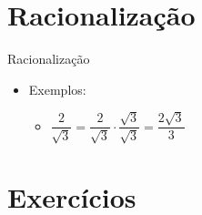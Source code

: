 \documentclass[14pt, aspectratio=169]{beamer}
\begin{document}
\section{Racionalização}

\begin{frame}[allowframebreaks]{Racionalização}

\begin{itemize}
    \item Exemplos:
    \begin{itemize}
        \item $\dfrac{2}{\sqrt{3}} = \dfrac{2}{\sqrt{3}} \cdot \dfrac{\sqrt{3}}{\sqrt{3}} = \dfrac{2\sqrt{3}}{3}$
    \end{itemize}
    
\end{itemize}
    
\end{frame}

\section{Exercícios}
\end{document}
